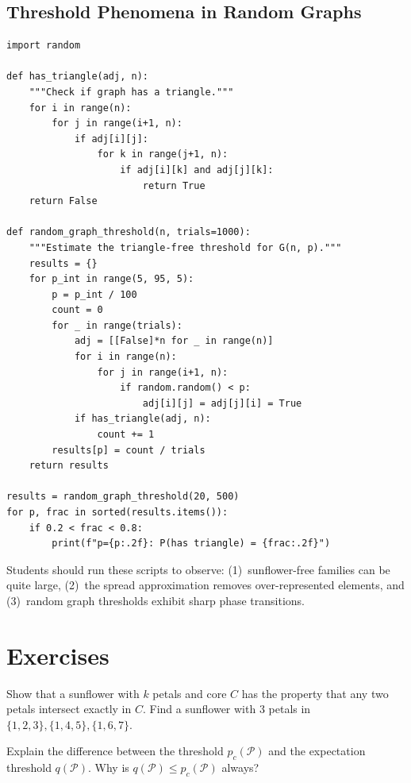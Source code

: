 \subsection{Threshold Phenomena in Random Graphs}

\begin{verbatim}
import random

def has_triangle(adj, n):
    """Check if graph has a triangle."""
    for i in range(n):
        for j in range(i+1, n):
            if adj[i][j]:
                for k in range(j+1, n):
                    if adj[i][k] and adj[j][k]:
                        return True
    return False

def random_graph_threshold(n, trials=1000):
    """Estimate the triangle-free threshold for G(n, p)."""
    results = {}
    for p_int in range(5, 95, 5):
        p = p_int / 100
        count = 0
        for _ in range(trials):
            adj = [[False]*n for _ in range(n)]
            for i in range(n):
                for j in range(i+1, n):
                    if random.random() < p:
                        adj[i][j] = adj[j][i] = True
            if has_triangle(adj, n):
                count += 1
        results[p] = count / trials
    return results

results = random_graph_threshold(20, 500)
for p, frac in sorted(results.items()):
    if 0.2 < frac < 0.8:
        print(f"p={p:.2f}: P(has triangle) = {frac:.2f}")
\end{verbatim}

\begin{highlightbox}
Students should run these scripts to observe: (1)~sunflower-free families can be quite large, (2)~the spread approximation removes over-represented elements, and (3)~random graph thresholds exhibit sharp phase transitions.
\end{highlightbox}

\section{Exercises}

\begin{exercise}[Basic]
Show that a sunflower with $k$ petals and core $C$ has the property that any two petals intersect exactly in $C$. Find a sunflower with 3 petals in $\{1,2,3\}, \{1,4,5\}, \{1,6,7\}$.
\end{exercise}

\begin{exercise}[Intermediate]
Explain the difference between the threshold $p_c(\mathcal{P})$ and the expectation threshold $q(\mathcal{P})$. Why is $q(\mathcal{P}) \le p_c(\mathcal{P})$ always?
\end{exercise}


